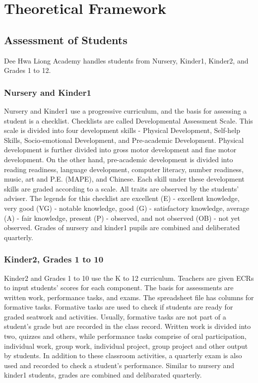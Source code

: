 \documentclass[11pt,a4paper,titlepage]{article}
\let\stdsection\section
\renewcommand\section{\newpage\stdsection}
\begin{document}
\section{Theoretical Framework}

\subsection{Assessment of Students}
Dee Hwa Liong Academy handles students from Nursery, Kinder1, Kinder2, and Grades 1 to 12.

\subsubsection{Nursery and Kinder1}
Nursery and Kinder1 use a progressive curriculum, and the basis for assessing a student is a checklist. Checklists are called Developmental Assessment Scale. This scale is divided into four development skills - Physical Development, Self-help Skills, Socio-emotional Development, and Pre-academic Development. Physical development is further divided into gross motor development and fine motor development. On the other hand, pre-academic development is divided into reading readiness, language development, computer literacy, number readiness, music, art and P.E. (MAPE), and Chinese. Each skill under these development skills are graded according to a scale. All traits are observed by the students' adviser. The legends for this checklist are excellent (E) - excellent knowledge, very good (VG) - notable knowledge, good (G) - satisfactory knowledge, average (A) - fair knowledge, present (P) - observed, and not observed (OB) - not yet observed. Grades of nursery and kinder1 pupils are combined and deliberated quarterly.

\subsubsection{Kinder2, Grades 1 to 10}
Kinder2 and Grades 1 to 10 use the K to 12 curriculum. Teachers are given ECRs to input students' scores for each component. The basis for assessments are written work, performance tasks, and exams. The spreadsheet file has columns for formative tasks. Formative tasks are used to check if students are ready for graded seatwork and activities. Usually, formative tasks are not part of a student's grade but are recorded in the class record. Written work is divided into two, quizzes and others, while performance tasks comprise of oral participation, individual work, group work, individual project, group project and other output by students. In addition to these classroom activities, a quarterly exam is also used and recorded to check a student's performance. Similar to nursery and kinder1 students, grades are combined and delibarated quarterly.
\end{document}
